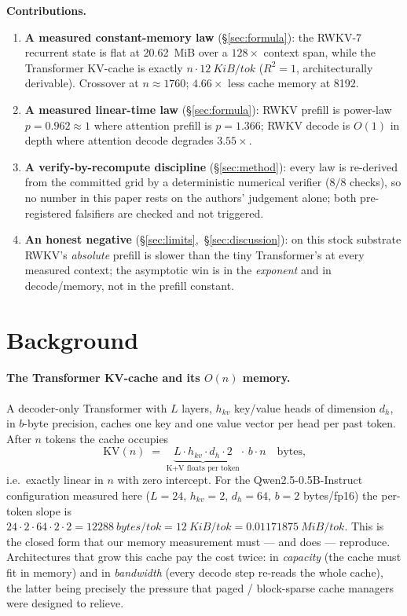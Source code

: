 \documentclass[11pt,a4paper]{article}
\newcommand{\ctx}{\ensuremath{n}}
\begin{document}
\medskip
\noindent\textbf{Contributions.}
\begin{enumerate}\itemsep0.3em
\item \textbf{A measured constant-memory law} (\S\ref{sec:formula}): the RWKV-7
  recurrent state is flat at \SI{20.62}{MiB} over a \(128\times\) context span,
  while the Transformer KV-cache is exactly \(\ctx\cdot\SI{12}{KiB/tok}\)
  (\(R^2=1\), architecturally derivable). Crossover at \(\ctx\approx\num{1760}\);
  \(4.66\times\) less cache memory at \num{8192}.
\item \textbf{A measured linear-time law} (\S\ref{sec:formula}): RWKV prefill is
  power-law \(p=0.962\approx1\) where attention prefill is \(p=1.366\); RWKV
  decode is \(O(1)\) in depth where attention decode degrades \(3.55\times\).
\item \textbf{A verify-by-recompute discipline} (\S\ref{sec:method}): every law
  is re-derived from the committed grid by a deterministic numerical verifier
  (\(8/8\) checks), so no number in this paper rests on the authors' judgement
  alone; both pre-registered falsifiers are checked and not triggered.
\item \textbf{An honest negative} (\S\ref{sec:limits},~\S\ref{sec:discussion}):
  on this stock substrate RWKV's \emph{absolute} prefill is slower than the tiny
  Transformer's at every measured context; the asymptotic win is in the
  \emph{exponent} and in decode/memory, not in the prefill constant.
\end{enumerate}

\section{Background}
\label{sec:bg}

\paragraph{The Transformer KV-cache and its \(O(\ctx)\) memory.}
A decoder-only Transformer with \(L\) layers, \(h_{kv}\) key/value heads of
dimension \(d_h\), in \(b\)-byte precision, caches one key and one value vector
per head per past token. After \(\ctx\) tokens the cache occupies
\begin{equation}
\label{eq:kv}
\mathrm{KV}(\ctx) \;=\; \underbrace{L \cdot h_{kv} \cdot d_h \cdot 2}_{\text{K{+}V floats per token}} \cdot\, b \cdot \ctx
\quad\text{bytes,}
\end{equation}
i.e.\ exactly linear in \(\ctx\) with zero intercept. For the
Qwen2.5-0.5B-Instruct configuration measured here
(\(L=24\), \(h_{kv}=2\), \(d_h=64\), \(b=2\) bytes/fp16) the per-token slope is
\(24\cdot 2\cdot 64\cdot 2\cdot 2 = \SI{12288}{bytes/tok} = \SI{12}{KiB/tok} =
\SI{0.01171875}{MiB/tok}\). This is the closed form that our memory measurement
must --- and does --- reproduce. Architectures that grow this cache pay the cost
twice: in \emph{capacity} (the cache must fit in memory) and in \emph{bandwidth}
(every decode step re-reads the whole cache), the latter being precisely the
pressure that paged / block-sparse cache managers
\citep{kwon2023vllm} were designed to relieve.
\end{document}
